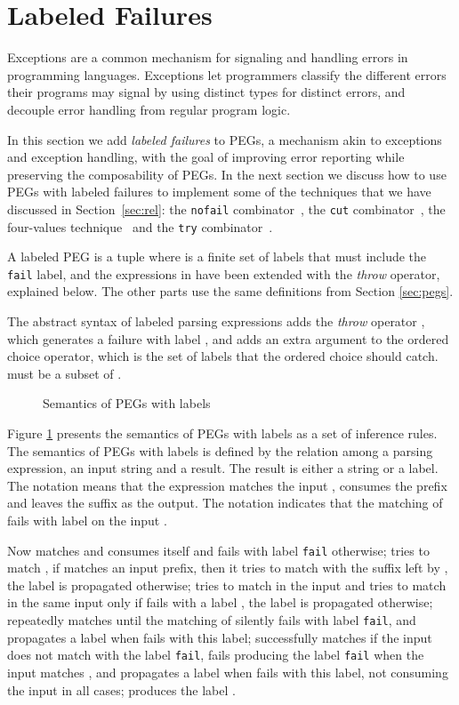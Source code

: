 \documentclass[3p,12pt,singlecolumn]{elsarticle}
\begin{document}
\section{Labeled Failures} \label{sec:lf}

Exceptions are a common mechanism for signaling and handling
errors in programming languages.
Exceptions let programmers classify the different errors their
programs may signal by using distinct types for distinct errors,
and decouple error handling from regular program logic.

In this section we add \emph{labeled failures} to PEGs,
a mechanism akin to exceptions and exception handling,
with the goal of improving error reporting while preserving
the composability of PEGs. In the next section we discuss how to use PEGs with labeled
failures to implement some of
the techniques that we have discussed in Section~\ref{sec:rel}: 
the \texttt{nofail} combinator~\cite{hutton1992hfp},
the \texttt{cut} combinator~\cite{rojemo1995epc},
the four-values technique~\cite{partridge1996fv} and
the \texttt{try} combinator~\cite{leijen2001parsec}.

A labeled PEG  is a tuple  where
 is a finite set of labels that must include the {\tt fail}
label, and the
expressions in  have been extended with the {\em throw}
operator, explained below. The other parts use the same definitions from Section \ref{sec:pegs}. 

The abstract syntax of labeled parsing expressions adds the
\emph{throw} operator , which generates a failure
with label , and adds an extra argument  to the ordered choice
operator, which is the set of labels that the ordered choice should
catch.  must be a subset of .


\begin{figure}
{\small

}
\caption{Semantics of PEGs with labels}
\label{fig:sem}
\end{figure}

Figure \ref{fig:sem} presents the semantics of PEGs with labels
as a set of inference rules.
The semantics of PEGs with labels is defined by the relation
 among a parsing expression, an input string and a result.
The result is either a string or a label.
The notation  means that the expression
 matches the input , consumes the prefix  and leaves the
suffix  as the output.
The notation  indicates that the
matching of  fails with label  on the input .

Now  matches and consumes itself and fails with label \texttt{fail}
otherwise;
 tries to match , if  matches an input prefix,
then it tries to match  with the suffix left by ,
the label  is propagated otherwise;
 tries to match  in the input and tries to
match  in the same input only if  fails with a label
, the label  is propagated otherwise;
 repeatedly matches  until the matching of 
silently fails with label {\tt fail}, and propagates a label 
when  fails with this label;
 successfully matches if the input does not match  with
the label {\tt fail}, fails producing the label \texttt{fail} when
the input matches , and propagates a label  when 
fails with this label, not consuming the input in all cases;
 produces the label .
\end{document}
